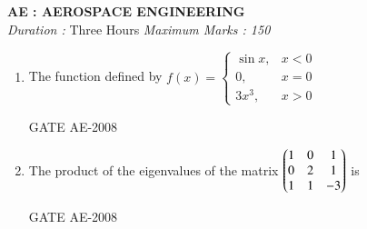 \documentclass[journal,12pt,onecolumn]{IEEEtran}
\theoremstyle{remark}
\begin{document}
\begin{center}
    \textbf{\Large AE : AEROSPACE ENGINEERING} \\[1ex]
    \textit{Duration :} Three Hours \hfill \textit{Maximum Marks : 150}
\end{center}

\quad

\quad

\begin{enumerate}
  
\item The function defined by
$
f(x) = \begin{cases}
\sin x, & x < 0 \\
0, & x = 0 \\
3x^3, & x > 0
\end{cases}
$

\begin{enumerate}
\end{enumerate}

\hfill{GATE AE-2008}
\quad

\item The product of the eigenvalues of the matrix
$
\begin{pmatrix}
1 & 0 & 1 \\
0 & 2 & 1 \\
1 & 1 & -3
\end{pmatrix}
$
is \\
\begin{enumerate}
\end{enumerate}
\hfill{GATE AE-2008}
\quad


\end{enumerate}
\end{document}
